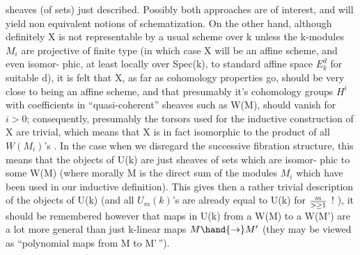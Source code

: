 
sheaves  (of sets) just described.  Possibly both approaches are
of interest,  and will yield non equivalent notions of schematization.
On the other hand,  although definitely X is not representable by a
usual  scheme over k unless the k-modules $M_i$ are projective of
finite type (in which case X will be an affine scheme,  and even isomor-%
phic,  at least locally over Spec(k),  to standard affine space $E_k^d$ for
suitable  d),  it is felt that X,  as far as cohomology properties go,
should be very close to being an affine scheme,  and that presumably
it's cohomology groups $H^i$  with coefficients in ``quasi-coherent'' 
sheaves such as W(M),  should vanish for $i>0$;  consequently,  presumably
the torsors used for the inductive construction of X are trivial,  which
means that X is in fact isomorphic to the product of all $W(M_i)$'s .  In
the case when we disregard the successive fibration structure,  this
means that the objects of U(k) are just sheaves of sets which are isomor-%
phic to some W(M)  (where morally M is the direct sum of the modules $M_i$
which have been used in our inductive definition).  This gives then a
rather trivial description of the objects of U(k) (and all $U_m(k)$'s are
already equal to U(k)\hand{,} for $m \over{>}{\geq} 1$ ! ),  it should be remembered however 
that maps in U(k)  from a W(M) to a W(M')  are a lot more general than
just k-linear maps  $M \hand{\to} M'$  (they may be viewed as ``polynomial maps
from M to M'\,'').

